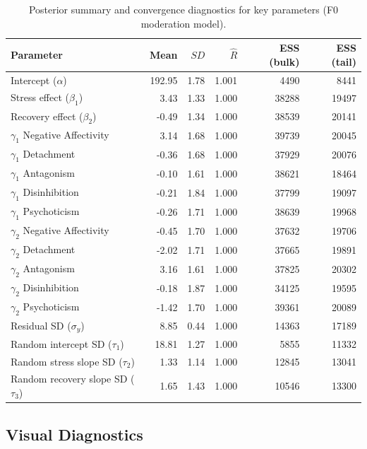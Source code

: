 \documentclass[
  english,
  man,floatsintext]{apa6}
\begin{document}
\begin{table}[!h]
\centering
\caption{\label{tab:table-s10-diagnostics}Posterior summary and convergence diagnostics for key parameters (F0 moderation model).}
\centering
\begin{tabular}[t]{lrrrrr}
\toprule
Parameter & Mean & $SD$ & $\hat{R}$ & ESS (bulk) & ESS (tail)\\
\midrule
Intercept ($\alpha$) & 192.95 & 1.78 & 1.001 & 4490 & 8441\\
Stress effect ($\beta_1$) & 3.43 & 1.33 & 1.000 & 38288 & 19497\\
Recovery effect ($\beta_2$) & -0.49 & 1.34 & 1.000 & 38539 & 20141\\
$\gamma_1$ Negative Affectivity & 3.14 & 1.68 & 1.000 & 39739 & 20045\\
$\gamma_1$ Detachment & -0.36 & 1.68 & 1.000 & 37929 & 20076\\
\addlinespace
$\gamma_1$ Antagonism & -0.10 & 1.61 & 1.000 & 38621 & 18464\\
$\gamma_1$ Disinhibition & -0.21 & 1.84 & 1.000 & 37799 & 19097\\
$\gamma_1$ Psychoticism & -0.26 & 1.71 & 1.000 & 38639 & 19968\\
$\gamma_2$ Negative Affectivity & -0.45 & 1.70 & 1.000 & 37632 & 19706\\
$\gamma_2$ Detachment & -2.02 & 1.71 & 1.000 & 37665 & 19891\\
\addlinespace
$\gamma_2$ Antagonism & 3.16 & 1.61 & 1.000 & 37825 & 20302\\
$\gamma_2$ Disinhibition & -0.18 & 1.87 & 1.000 & 34125 & 19595\\
$\gamma_2$ Psychoticism & -1.42 & 1.70 & 1.000 & 39361 & 20089\\
Residual SD ($\sigma_y$) & 8.85 & 0.44 & 1.000 & 14363 & 17189\\
Random intercept SD ($\tau_1$) & 18.81 & 1.27 & 1.000 & 5855 & 11332\\
\addlinespace
Random stress slope SD ($\tau_2$) & 1.33 & 1.14 & 1.000 & 12845 & 13041\\
Random recovery slope SD ($\tau_3$) & 1.65 & 1.43 & 1.000 & 10546 & 13300\\
\bottomrule
\end{tabular}
\end{table}

\subsection{Visual Diagnostics}\label{visual-diagnostics}
\end{document}
